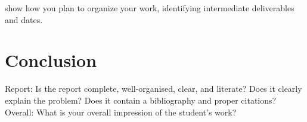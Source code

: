 \documentclass{mprop}
\begin{document}
show how you plan to organize your work, identifying intermediate deliverables and dates.

\section{Conclusion}

Report: Is the report complete, well-organised, clear, and literate? Does it clearly explain the problem? Does it contain a bibliography and proper citations?
Overall: What is your overall impression of the student’s work?



\end{document}
